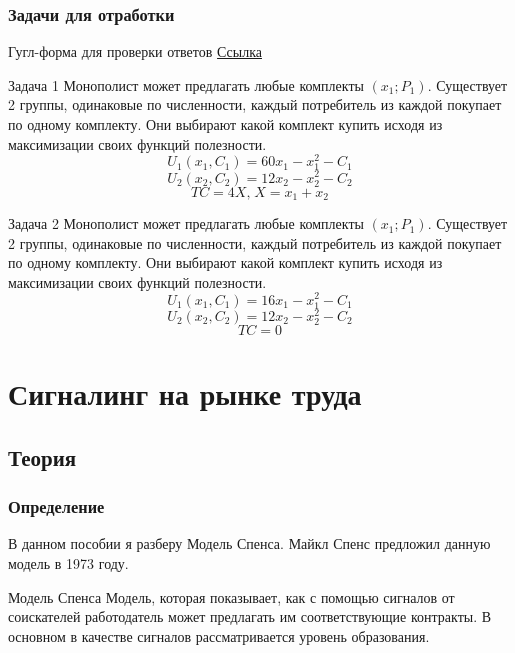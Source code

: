 \subsection{Задачи для отработки}

\begin{mybox}{Гугл-форма для проверки ответов}
    \href{https://forms.gle/Ka76oAsLQDdQsKNR9}{Ссылка}
\end{mybox}

\begin{mybox}{Задача 1}
    Монополист может предлагать любые комплекты $(x_1;P_1)$. Существует 2 группы, одинаковые по численности, каждый
    потребитель из каждой покупает по одному комплекту. Они выбирают какой комплект купить исходя из максимизации своих
    функций полезности. \\
    $$U_1(x_1,C_1)=60x_1-x_1^2-C_1$$
    $$U_2(x_2,C_2)=12x_2-x_2^2-C_2$$
    $$TC=4X\text{,}\;X=x_1+x_2$$
\end{mybox}

\begin{mybox}{Задача 2}
    Монополист может предлагать любые комплекты $(x_1;P_1)$. Существует 2 группы, одинаковые по численности, каждый потребитель из каждой покупает по одному комплекту. Они выбирают какой комплект купить исходя из максимизации своих функций полезности. \\
    $$U_1(x_1,C_1)=16x_1-x_1^2-C_1$$
    $$U_2(x_2,C_2)=12x_2-x_2^2-C_2$$
    $$TC=0$$
\end{mybox}

\newpage



\chapter{Сигналинг на рынке труда}


\section{Теория}

\subsection{Определение}

\indent\setlength{\parindent}{1em}В данном пособии я разберу Модель Спенса. Майкл Спенс предложил данную модель в 1973 году.

\begin{mybox}{Модель Спенса}
    Модель, которая показывает, как с помощью сигналов от соискателей работодатель может предлагать им соответствующие
    контракты. В основном в качестве сигналов рассматривается уровень образования.
\end{mybox}

